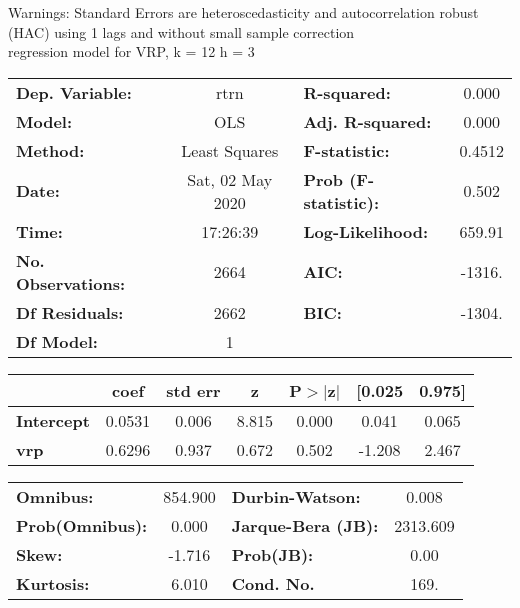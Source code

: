 Warnings: \newline
 [1] Standard Errors are heteroscedasticity and autocorrelation robust (HAC) using 1 lags and without small sample correction\\ 

regression model for VRP, k = 12 h = 3\begin{center}
\begin{tabular}{lclc}
\toprule
\textbf{Dep. Variable:}    &       rtrn       & \textbf{  R-squared:         } &     0.000   \\
\textbf{Model:}            &       OLS        & \textbf{  Adj. R-squared:    } &     0.000   \\
\textbf{Method:}           &  Least Squares   & \textbf{  F-statistic:       } &    0.4512   \\
\textbf{Date:}             & Sat, 02 May 2020 & \textbf{  Prob (F-statistic):} &    0.502    \\
\textbf{Time:}             &     17:26:39     & \textbf{  Log-Likelihood:    } &    659.91   \\
\textbf{No. Observations:} &        2664      & \textbf{  AIC:               } &    -1316.   \\
\textbf{Df Residuals:}     &        2662      & \textbf{  BIC:               } &    -1304.   \\
\textbf{Df Model:}         &           1      & \textbf{                     } &             \\
\bottomrule
\end{tabular}
\begin{tabular}{lcccccc}
                   & \textbf{coef} & \textbf{std err} & \textbf{z} & \textbf{P$> |$z$|$} & \textbf{[0.025} & \textbf{0.975]}  \\
\midrule
\textbf{Intercept} &       0.0531  &        0.006     &     8.815  &         0.000        &        0.041    &        0.065     \\
\textbf{vrp}       &       0.6296  &        0.937     &     0.672  &         0.502        &       -1.208    &        2.467     \\
\bottomrule
\end{tabular}
\begin{tabular}{lclc}
\textbf{Omnibus:}       & 854.900 & \textbf{  Durbin-Watson:     } &    0.008  \\
\textbf{Prob(Omnibus):} &   0.000 & \textbf{  Jarque-Bera (JB):  } & 2313.609  \\
\textbf{Skew:}          &  -1.716 & \textbf{  Prob(JB):          } &     0.00  \\
\textbf{Kurtosis:}      &   6.010 & \textbf{  Cond. No.          } &     169.  \\
\bottomrule
\end{tabular}
\end{center}

